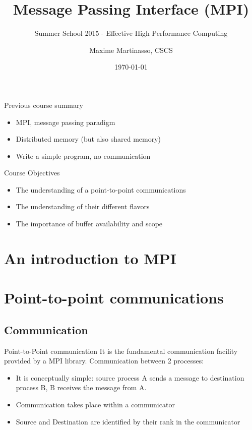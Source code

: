 \documentclass[aspectratio=43]{beamer}
\author{Maxime Martinasso, CSCS}
\title{Message Passing Interface (MPI)}
\subtitle{Summer School 2015 - Effective High Performance Computing}
\date{\today}
\begin{document}
\cscstitle

\begin{frame}{Previous course summary}
\begin{itemize}
\item MPI, message passing paradigm
\item Distributed memory (but also shared memory)
\item Write a simple program, no communication
\end{itemize}
\end{frame}

\begin{frame}{Course Objectives}
\begin{itemize}
\item The understanding of a point-to-point communications
\item The understanding of their different flavors
\item The importance of buffer availability and scope
\end{itemize}
\end{frame}


\section{An introduction to MPI}
\section{Point-to-point communications}


\subsection{Communication}

\begin{frame}{Point-to-Point communication}
It is the fundamental communication facility provided by a MPI library.
Communication between 2 processes:
\begin{itemize}
\item It is conceptually simple: source process A sends a message to destination process B, B receives the message from A.
\item Communication takes place within a communicator
\item Source and Destination are identified by their rank in the communicator
\end{itemize}
\end{frame}
\end{document}
